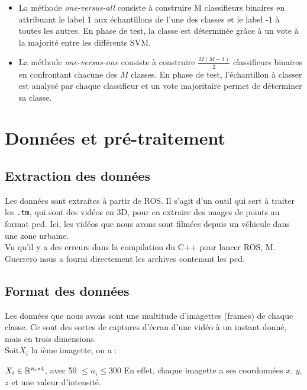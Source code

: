 	\begin{itemize}
	\item La méthode \emph{one-versus-all} consiste à construire M classifieurs binaires en attribuant le label 1 aux échantillons de l'une des classes et le label -1 à toutes les autres. En phase de test, la classe est déterminée grâce à un vote à la majorité entre les différents SVM.
	\item La méthode \emph{one-versus-one} consiste à construire $\frac{M(M-1)}{2}$ classifieurs binaires en confrontant chacune des $M$ classes. En phase de test, l'échantillon à classer est analysé par chaque classifieur et un vote majoritaire permet de déterminer sa classe.\\
	\end{itemize}


\section{Données et pré-traitement}
\subsection{Extraction des données}

	Les données sont extraites à partir de ROS. Il s'agit d'un outil qui sert à traiter les \texttt{.tm}, qui sont des vidéos en 3D, pour en extraire des nuages de points au format pcd. Ici, les vidéos que nous avons sont filmées depuis un véhicule dans une zone urbaine.\\

	Vu qu’il y a des erreurs dans la compilation du C++ pour lancer ROS, M. Guerrero nous a fourni directement les archives contenant les pcd.\\

\subsection{Format des données}

	Les données que nous avons sont une multitude d'imagettes (frames) de chaque classe. Ce sont des sortes de captures d'écran d'une vidéo à un instant donné, mais en trois dimensions.\\

	Soit$ X_{i}$ la ième imagette, on a :

	$  X_{i} \in \mathbb{R}^{n_{i}*4} $, avec 50 $\leq n_{i} \leq 300$
	En effet, chaque imagette a ses coordonnées $x$, $y$, $z$ et une valeur d'intensité. \\


